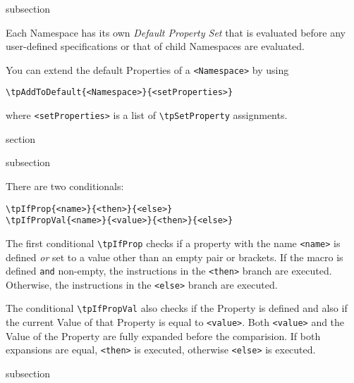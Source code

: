 \begin{heading}{subsection}
\end{heading}

Each Namespace has its own \textit{Default Property Set} that is
evaluated before any user-defined specifications or that of child
Namespaces are evaluated.

You can extend the default Properties of a \lstinline{<Namespace>} by
using
\begin{lstlisting}[style=tex]
\tpAddToDefault{<Namespace>}{<setProperties>}
\end{lstlisting}
where \lstinline{<setProperties>} is a list of \lstinline{\tpSetProperty}
assignments.\Hack{\newpage}

\begin{heading}{section}
\end{heading}

\begin{heading}{subsection}
\end{heading}

There are two conditionals:
\begin{lstlisting}[style=tex]
\tpIfProp{<name>}{<then>}{<else>}
\tpIfPropVal{<name>}{<value>}{<then>}{<else>}
\end{lstlisting}
The first conditional \lstinline{\tpIfProp} checks if a property with
the name \lstinline{<name>} is defined \textit{or} set to a value
other than an empty pair or brackets. If the macro is defined
\lstinline{and} non-empty, the instructions in the \lstinline{<then>}
branch are executed. Otherwise, the instructions in the
\lstinline{<else>} branch are executed.

The conditional \lstinline{\tpIfPropVal} also checks if the Property
is defined and also if the current Value of that Property is equal to
\lstinline{<value>}. Both \lstinline{<value>} and the Value of the
Property are fully expanded before the comparision. If both expansions
are equal, \lstinline{<then>} is executed, otherwise
\lstinline{<else>} is executed.

\begin{heading}{subsection}
\end{heading}

